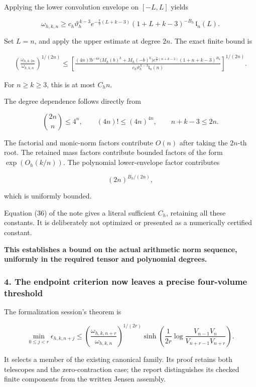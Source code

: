 Applying the lower convolution envelope on \([-L,L]\) yields

\[
\boxed{
\omega_{h,k,n}
\ge
c_h\vartheta_h^{\,k-3}
e^{-\frac\pi2(L+k-3)}
(1+L+k-3)^{-B_h}\,
\mathfrak l_n(L).
}
\]

Set \(L=n\), and apply the upper estimate at degree \(2n\). The exact finite bound is

\[
\boxed{
\begin{aligned}
\left(\frac{\omega_{h,k,2n}}{\omega_{h,k,n}}\right)^{1/(2n)}
\le
\left[
\frac{
(4n)!b^{-4n}
\bigl(M_h(b)^k+M_h(-b)^k\bigr)
e^{\frac\pi2(n+k-3)}
(1+n+k-3)^{B_h}
}{
c_h\vartheta_h^{\,k-3}\mathfrak l_n(n)
}
\right]^{1/(2n)}.
\end{aligned}
}
\]

For \(n\ge k\ge3\), this is at most \(C_hn\).

The degree dependence follows directly from

\[
\binom{2n}{n}\le4^n,
\qquad
(4n)!\le(4n)^{4n},
\qquad
n+k-3\le2n.
\]

The factorial and monic-norm factors contribute \(O(n)\) after taking the \(2n\)-th root. The retained mass factors contribute bounded factors of the form \(\exp(O_h(k/n))\). The polynomial lower-envelope factor contributes

\[
(2n)^{B_h/(2n)},
\]

which is uniformly bounded.

Equation (36) of the note gives a literal sufficient \(C_h\), retaining all these constants. It is deliberately not optimized or presented as a numerically certified constant.

\textbf{This establishes a bound on the actual arithmetic norm sequence, uniformly in the required tensor and polynomial degrees.}

\subsubsection{4. The endpoint criterion now leaves a precise four-volume threshold}\label{endpoint-user_norm_original--the-endpoint-criterion-now-leaves-a-precise-four-volume-threshold}

The formalization session's theorem is

\[
\boxed{
\min_{0\le j<r}\epsilon_{h,k,n+j}
\le
\left(\frac{\omega_{h,k,n+r}}{\omega_{h,k,n}}\right)^{1/(2r)}
\sinh\!\left(
\frac1{2r}
\log\frac{V_{n-1}V_n}{V_{n+r-1}V_{n+r}}
\right).
}
\]

It selects a member of the existing canonical family. Its proof retains both telescopes and the zero-contraction case; the report distinguishes its checked finite components from the written Jensen assembly.

